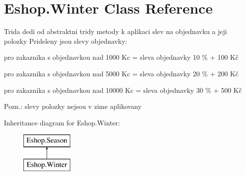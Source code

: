 \hypertarget{class_eshop_1_1_winter}{}\section{Eshop.\+Winter Class Reference}
\label{class_eshop_1_1_winter}


Trida dedi od abstraktni tridy metody k aplikaci slev na objednavku a jeji polozky Prideleny jsou slevy objednavky\+: 
\begin{DoxyItemize}
\item pro zakaznika s objednavkou nad 1000 Kc = sleva objednavky 10 \% + 100 Kč  
\item pro zakaznika s objednavkou nad 5000 Kc = sleva objednavky 20 \% + 200 Kč  
\item pro zakaznika s objednavkou nad 10000 Kc = sleva objednavky 30 \% + 500 Kč  
\end{DoxyItemize}Pozn.\+: slevy polozky nejsou v zime aplikovany  


Inheritance diagram for Eshop.\+Winter\+:\begin{figure}[H]
\begin{center}
\leavevmode
\includegraphics[height=2.000000cm]{class_eshop_1_1_winter}
\end{center}
\end{figure}

